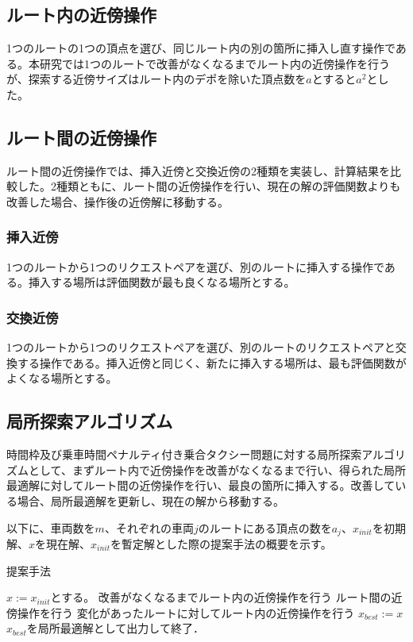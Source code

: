 \subsection{ルート内の近傍操作}
1つのルートの1つの頂点を選び、同じルート内の別の箇所に挿入し直す操作である。本研究では1つのルートで改善がなくなるまでルート内の近傍操作を行うが、探索する近傍サイズはルート内のデポを除いた頂点数を$a$とすると$a^2$とした。

\subsection{ルート間の近傍操作}
ルート間の近傍操作では、挿入近傍と交換近傍の2種類を実装し、計算結果を比較した。2種類ともに、ルート間の近傍操作を行い、現在の解の評価関数よりも改善した場合、操作後の近傍解に移動する。
\subsubsection{挿入近傍}
1つのルートから1つのリクエストペアを選び、別のルートに挿入する操作である。挿入する場所は評価関数が最も良くなる場所とする。
\subsubsection{交換近傍}
1つのルートから1つのリクエストペアを選び、別のルートのリクエストペアと交換する操作である。挿入近傍と同じく、新たに挿入する場所は、最も評価関数がよくなる場所とする。
\subsection{局所探索アルゴリズム}
時間枠及び乗車時間ペナルティ付き乗合タクシー問題に対する局所探索アルゴリズムとして、まずルート内で近傍操作を改善がなくなるまで行い、得られた局所最適解に対してルート間の近傍操作を行い、最良の箇所に挿入する。改善している場合、局所最適解を更新し、現在の解から移動する。

以下に、車両数を$m$、それぞれの車両$j$のルートにある頂点の数を$a_j$、$x_{init}$を初期解、$x$を現在解、$x_{init}$を暫定解とした際の提案手法の概要を示す。
\begin{algorithm}
 \caption{提案手法}
 \label{algo1}
 \begin{algorithmic}[1]%
  \STATE $x := x_{init}$とする。
  \STATE 改善がなくなるまでルート内の近傍操作を行う
  \STATE ルート間の近傍操作を行う
  \STATE 変化があったルートに対してルート内の近傍操作を行う
  \STATE  $x_{best} := x$
  \ENDIF
  \STATE $x_{best}$を局所最適解として出力して終了．
 \end{algorithmic}
\end{algorithm}
